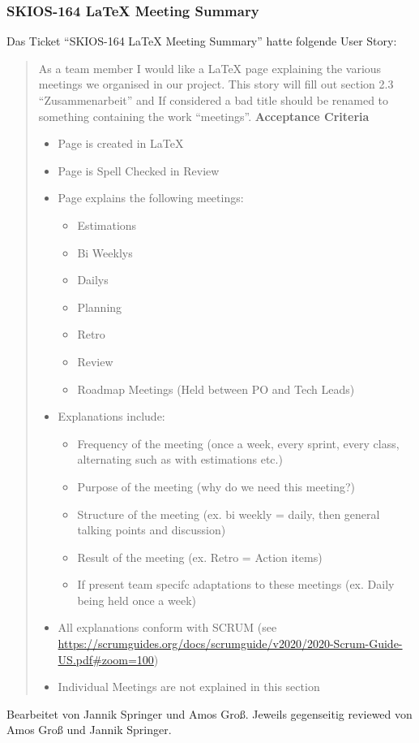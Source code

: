 \subsubsection{SKIOS-164 LaTeX Meeting Summary}
Das Ticket \enquote{SKIOS-164 LaTeX Meeting Summary} hatte folgende User Story:
\begin{quotation}
    As a team member I would like a LaTeX page explaining the various meetings we organised in our project.
    This story will fill out section 2.3 \enquote{Zusammenarbeit} and If considered a bad title should be renamed to something containing the work \enquote{meetings}.
\textbf{Acceptance Criteria}
\begin{itemize}
    \item Page is created in LaTeX
    \item Page is Spell Checked in Review
    \item Page explains the following meetings:
    \begin{itemize}
        \item Estimations
        \item Bi Weeklys
        \item Dailys
        \item Planning
        \item Retro
        \item Review
        \item Roadmap Meetings (Held between PO and Tech Leads)
    \end{itemize}
    \item Explanations include:
    \begin{itemize}
        \item Frequency of the meeting (once a week, every sprint, every class, alternating such as with estimations etc.)
        \item Purpose of the meeting (why do we need this meeting?)
        \item Structure of the meeting (ex. bi weekly = daily, then general talking points and discussion)
        \item Result of the meeting (ex. Retro = Action items)
        \item If present team specifc adaptations to these meetings (ex. Daily being held once a week)
    \end{itemize}
    \item All explanations conform with SCRUM (see \url{https://scrumguides.org/docs/scrumguide/v2020/2020-Scrum-Guide-US.pdf#zoom=100})
    \item Individual Meetings are not explained in this section
\end{itemize}
\end{quotation}
Bearbeitet von Jannik Springer und Amos Groß.
Jeweils gegenseitig reviewed von Amos Groß und Jannik Springer.

